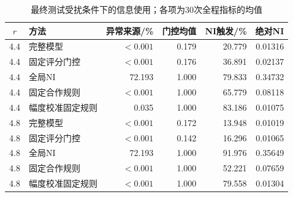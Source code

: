 \begin{table}[!htbp]
\centering\small
\caption{最终测试受扰条件下的信息使用；各项为30次全程指标的均值}
\label{tab:w2-final-mechanism}
\begin{tabular}{clrrrr}
\toprule
$r$ & 方法 & 异常来源/\% & 门控均值 & NI触发/\% & 绝对NI \\
\midrule
4.4 & 完整模型 & $<0.001$ & 0.179 & 20.779 & 0.01316 \\
4.4 & 固定评分门控 & $<0.001$ & 0.176 & 36.891 & 0.02137 \\
4.4 & 全局NI & 72.193 & 1.000 & 79.833 & 0.34732 \\
4.4 & 固定合作规则 & $<0.001$ & 1.000 & 65.779 & 0.08118 \\
4.4 & 幅度校准固定规则 & 0.035 & 1.000 & 83.186 & 0.01075 \\
\midrule
4.8 & 完整模型 & $<0.001$ & 0.172 & 13.948 & 0.01019 \\
4.8 & 固定评分门控 & $<0.001$ & 0.142 & 16.296 & 0.01065 \\
4.8 & 全局NI & 72.193 & 1.000 & 91.976 & 0.35649 \\
4.8 & 固定合作规则 & $<0.001$ & 1.000 & 52.221 & 0.07659 \\
4.8 & 幅度校准固定规则 & $<0.001$ & 1.000 & 79.558 & 0.01304 \\
\bottomrule
\end{tabular}
\par{}
\end{table}
